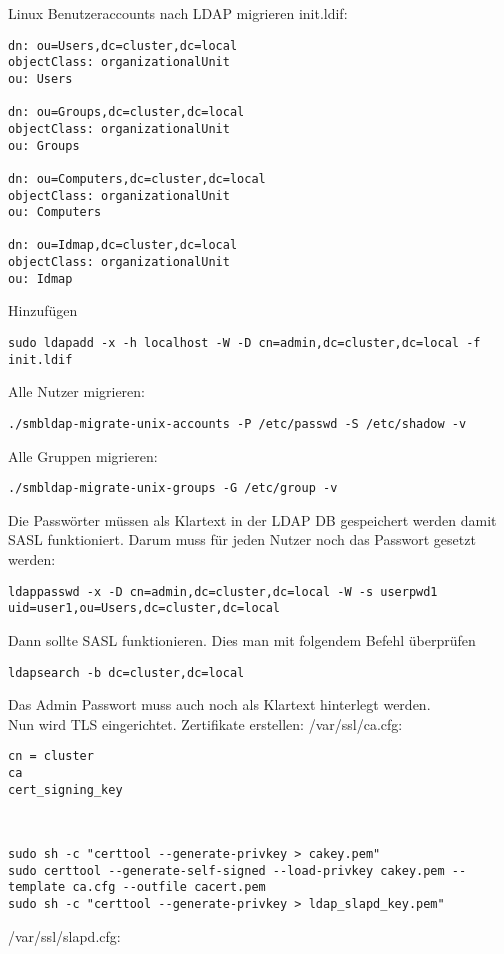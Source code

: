 Linux Benutzeraccounts nach LDAP migrieren
init.ldif:
\begin{lstlisting}[style=Bash]
dn: ou=Users,dc=cluster,dc=local
objectClass: organizationalUnit
ou: Users

dn: ou=Groups,dc=cluster,dc=local
objectClass: organizationalUnit
ou: Groups

dn: ou=Computers,dc=cluster,dc=local
objectClass: organizationalUnit
ou: Computers

dn: ou=Idmap,dc=cluster,dc=local
objectClass: organizationalUnit
ou: Idmap
\end{lstlisting}
Hinzufügen
\begin{lstlisting}[style=Bash]
sudo ldapadd -x -h localhost -W -D cn=admin,dc=cluster,dc=local -f init.ldif
\end{lstlisting}
Alle Nutzer migrieren:
\begin{lstlisting}[style=Bash]
./smbldap-migrate-unix-accounts -P /etc/passwd -S /etc/shadow -v
\end{lstlisting}
Alle Gruppen migrieren:
\begin{lstlisting}[style=Bash]
./smbldap-migrate-unix-groups -G /etc/group -v 
\end{lstlisting}
Die Passwörter müssen als Klartext in der LDAP DB gespeichert werden damit SASL funktioniert. Darum muss für jeden Nutzer noch das Passwort gesetzt werden:
\begin{lstlisting}[style=Bash]
ldappasswd -x -D cn=admin,dc=cluster,dc=local -W -s userpwd1 uid=user1,ou=Users,dc=cluster,dc=local 
\end{lstlisting}
Dann sollte SASL funktionieren. Dies man mit folgendem Befehl überprüfen
\begin{lstlisting}[style=Bash]
ldapsearch -b dc=cluster,dc=local
\end{lstlisting}
Das Admin Passwort muss auch noch als Klartext hinterlegt werden.
\\
Nun wird TLS eingerichtet.
Zertifikate erstellen:
/var/ssl/ca.cfg:
\begin{lstlisting}[style=Bash]
cn = cluster
ca
cert_signing_key
\end{lstlisting}
\\
\begin{lstlisting}[style=Bash]
sudo sh -c "certtool --generate-privkey > cakey.pem" 
sudo certtool --generate-self-signed --load-privkey cakey.pem --template ca.cfg --outfile cacert.pem 
sudo sh -c "certtool --generate-privkey > ldap_slapd_key.pem"
\end{lstlisting}
/var/ssl/slapd.cfg:
